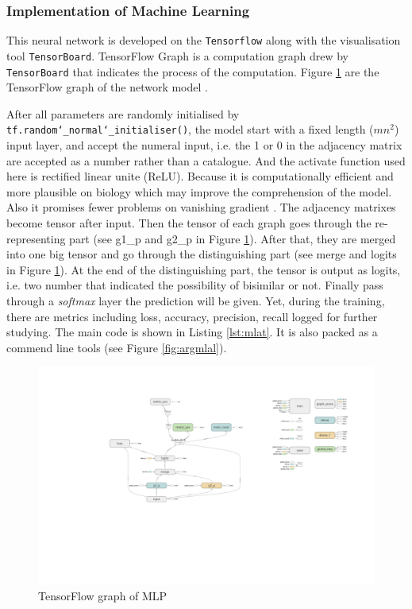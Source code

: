 \subsubsection{Implementation of Machine Learning}
This neural network is developed on the \texttt{Tensorflow} along with the visualisation tool \texttt{TensorBoard}.
TensorFlow Graph is a computation graph drew by \texttt{TensorBoard} that indicates the process of the computation.
Figure \ref{fig:tfgraph} are the TensorFlow graph of the network model .

After all parameters are randomly initialised by \texttt{tf.random\char`_normal\char`_initialiser()}, the model start with a fixed length ($mn^2$) input layer, and accept the numeral input, i.e. the 1 or 0 in the adjacency matrix are accepted as a number rather than a catalogue.
And the activate function used here is rectified linear unite (ReLU).
Because it is computationally efficient and more plausible on biology which may improve the comprehension of the model.
Also it promises fewer problems on vanishing gradient \cite{pmlr-v15-glorot11a}.
The adjacency matrixes become tensor after input.
Then the tensor of each graph goes through the re-representing part (see g1\_p and g2\_p in Figure \ref{fig:tfgraph}).
After that, they are merged into one big tensor and go through the distinguishing part (see merge and logits in Figure \ref{fig:tfgraph}).
At the end of the distinguishing part, the tensor is output as logits, i.e. two number that indicated the possibility of bisimilar or not.
Finally pass through a \emph{softmax} layer the prediction will be given.
Yet, during the training, there are metrics including loss, accuracy, precision, recall logged for further studying.
The main code is shown in Listing \ref{lst:mlat}.
It is also packed as a commend line tools (see Figure \ref{fig:argmlal}).

\begin{figure}[h]
\centering
\includegraphics[width=\textwidth]{img/tfgraph.pdf}
\caption{TensorFlow graph of MLP}
\label{fig:tfgraph}
\end{figure}

